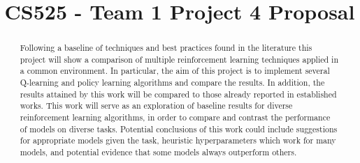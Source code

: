 \documentclass[conference]{IEEEtran}
\begin{document}
\title{CS525 - Team 1 Project 4 Proposal}

\author{

\and


\and


\and


\and

}

\maketitle

\begin{abstract}
    Following a baseline of techniques and best practices found in the literature this project will show a comparison of multiple reinforcement learning techniques applied in a common environment.
    In particular, the aim of this project is to implement several Q-learning and policy learning algorithms and compare the results.
    In addition, the results attained by this work will be compared to those already reported in established works. This work will serve as an exploration of baseline results for diverse reinforcement learning algorithms, in order to compare and contrast the performance of models on diverse tasks. Potential conclusions of this work could include suggestions for appropriate models given the task, heuristic hyperparameters which work for many models, and potential evidence that some models always outperform others.
\end{abstract}
\end{document}
